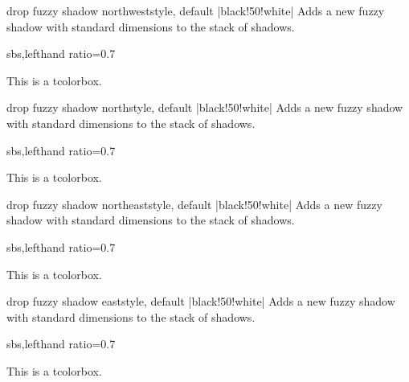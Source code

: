 \clearpage
\begin{docTcbKey}{drop fuzzy shadow northwest}{}{style, default |black!50!white|}
  Adds a new fuzzy shadow with standard dimensions to the stack of shadows.
\begin{dispExample*}{sbs,lefthand ratio=0.7}
\begin{tcolorbox}[drop fuzzy shadow northwest,
  enhanced,colback=red!5!white,colframe=red!75!black]
  This is a tcolorbox.
\end{tcolorbox}
\end{dispExample*}
\end{docTcbKey}%

\begin{docTcbKey}{drop fuzzy shadow north}{}{style, default |black!50!white|}
  Adds a new fuzzy shadow with standard dimensions to the stack of shadows.
\begin{dispExample*}{sbs,lefthand ratio=0.7}
\begin{tcolorbox}[drop fuzzy shadow north,
  enhanced,colback=red!5!white,colframe=red!75!black]
  This is a tcolorbox.
\end{tcolorbox}
\end{dispExample*}
\end{docTcbKey}%

\begin{docTcbKey}{drop fuzzy shadow northeast}{}{style, default |black!50!white|}
  Adds a new fuzzy shadow with standard dimensions to the stack of shadows.
\begin{dispExample*}{sbs,lefthand ratio=0.7}
\begin{tcolorbox}[drop fuzzy shadow northeast,
  enhanced,colback=red!5!white,colframe=red!75!black]
  This is a tcolorbox.
\end{tcolorbox}
\end{dispExample*}
\end{docTcbKey}%

\begin{docTcbKey}{drop fuzzy shadow east}{}{style, default |black!50!white|}
  Adds a new fuzzy shadow with standard dimensions to the stack of shadows.
\begin{dispExample*}{sbs,lefthand ratio=0.7}
\begin{tcolorbox}[drop fuzzy shadow east,
  enhanced,colback=red!5!white,colframe=red!75!black]
  This is a tcolorbox.
\end{tcolorbox}
\end{dispExample*}
\end{docTcbKey}%


